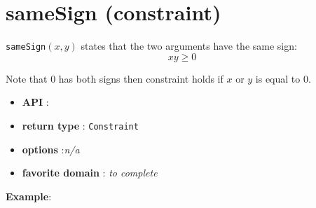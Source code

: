 \label{samesign}
\hypertarget{samesign}{}

\section{sameSign (constraint)}\label{samesign:samesignconstraint}\hypertarget{samesign:samesignconstraint}{}
\begin{notedef}
  \texttt{sameSign}$(x,y)$ states that the two arguments have the same sign:
$$xy\ge 0$$
\end{notedef}
Note that $0$ has both signs then constraint holds if $x$ or $y$ is equal to 0.

\begin{itemize}
	\item \textbf{API} : 
	\item \textbf{return type} : \texttt{Constraint}
	\item \textbf{options} :\emph{n/a}
	\item \textbf{favorite domain} : \emph{to complete}
\end{itemize}

\textbf{Example}:

